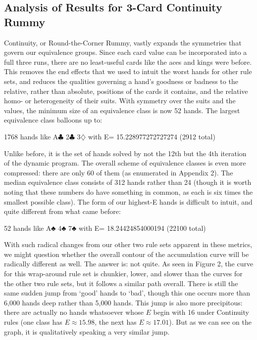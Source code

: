 \documentclass[paper=a4, fontsize=11pt,twoside]{report}   %
\begin{document}
\subsection{Analysis of Results for 3-Card Continuity Rummy}

Continuity, or Round-the-Corner Rummy, vastly expands the symmetries that govern our equivalence groups. Since each card value can be incorporated into a full three runs, there are no least-useful cards like the aces and kings were before. This removes the end effects that we used to intuit the worst hands for other rule sets, and reduces the qualities governing a hand’s goodness or badness to the relative, rather than absolute, positions of the cards it contains, and the relative homo- or heterogeneity of their suits. With symmetry over the suits and the values, the minimum size of an equivalence class is now 52 hands. The largest equivalence class balloons up to: 

1768 hands like A$\clubsuit$ 2$\clubsuit$ 3$\diamondsuit$ with E= 15.228977272727274 (2912 total) 

Unlike before, it is the set of hands solved by not the 12th but the 4th iteration of the dynamic program. The overall scheme of equivalence classes is even more compressed: there are only 60 of them (as enumerated in Appendix 2). The median equivalence class consists of 312 hands rather than 24 (though it is worth noting that these numbers do have something in common, as each is six times the smallest possible class). The form of our highest-E hands is difficult to intuit, and quite different from what came before: 

52 hands like A♣ 4♣ 7♣ with E= 18.24424854000194 (22100 total)

With such radical changes from our other two rule sets apparent in these metrics, we might question whether the overall contour of the accumulation curve will be radically different as well. The answer is: not quite. As seen in Figure 2, the curve for this wrap-around rule set is chunkier, lower, and slower than the curves for the other two rule sets, but it follows a similar path overall. There is still the same sudden jump from ‘good’ hands to ‘bad’, though this one occurs more than 6,000 hands deep rather than 5,000 hands. This jump is also more precipitous: there are  actually no hands whatsoever whose $E$ begin with 16 under Continuity rules (one class has $E \approx 15.98$, the next has $E \approx 17.01$). But as we can see on the graph, it is qualitatively speaking a very similar jump. 
\end{document}
